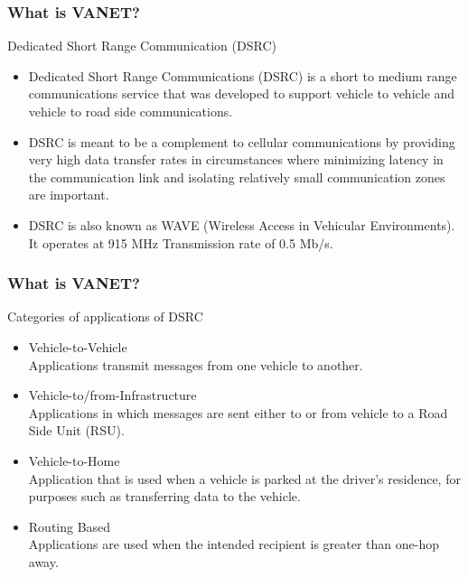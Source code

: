 \documentclass{beamer}
\begin{document}
\begin{frame}
	\frametitle{What is VANET?}
	\begin{block}{Dedicated Short Range
			Communication 
			(DSRC)}
		\begin{itemize}
			\item Dedicated Short Range Communications (DSRC) is a short to medium range communications service 
			that  was  developed  to  support vehicle	to vehicle and  vehicle to road side  communications.
			\item DSRC is meant to be a complement to cellular communications by providing very high data transfer rates in circumstances where minimizing latency in the communication link and isolating relatively small communication zones are important.\\
			\item DSRC is also known as WAVE (Wireless Access in Vehicular Environments).
			It operates at 915 MHz 
			Transmission rate of 0.5 Mb/s.
			
			
		\end{itemize}
	\end{block}
	
\end{frame}
\begin{frame}
	\frametitle{What is VANET?}
	\begin{block}{Categories of applications of DSRC }
		\begin{itemize}
			\item Vehicle-to-Vehicle\\ 
			Applications transmit messages from one vehicle to another.\\
			\item Vehicle-to/from-Infrastructure \\
			Applications in which messages are sent either to or from vehicle to a Road Side Unit (RSU).\\
			\item Vehicle-to-Home\\ 
			Application that is used when a vehicle is parked at the driver’s residence, for purposes such as transferring data to the vehicle.\\
			\item Routing Based \\
			Applications are used when the intended recipient is greater than one-hop away.
			
			
		\end{itemize}
	\end{block}
	
\end{frame}
\end{document}
